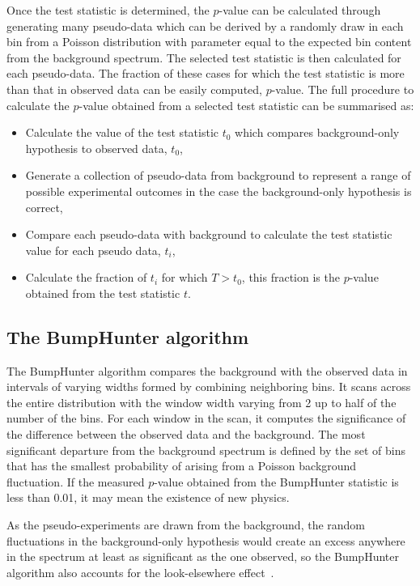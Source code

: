 Once the test statistic is determined, the $p$-value can be calculated through generating many pseudo-data which can be derived by a randomly draw in each bin from a Poisson distribution with parameter equal to the expected bin content from the background spectrum.
The selected test statistic is then calculated for each pseudo-data.
The fraction of these cases for which the test statistic is more than that in observed data can be easily computed, $p$-value.
The full procedure to calculate the $p$-value obtained from a selected test statistic can be summarised as:
\begin{itemize}
        \item Calculate the value of the test statistic $t_{0}$ which compares background-only hypothesis to observed data, $t_{0}$,
        \item Generate a collection of pseudo-data from background to represent a range of possible experimental outcomes in the case the background-only hypothesis is correct,
        \item Compare each pseudo-data with background to calculate the test statistic value for each pseudo data, $t_{i}$,
        \item Calculate the fraction of $t_{i}$ for which $T > t_{0}$, this fraction is the $p$-value obtained from the test statistic $t$.
\end{itemize}

\subsection{The BumpHunter algorithm}
The BumpHunter algorithm compares the background with the observed data in intervals of varying widths formed by combining neighboring bins. 
It scans across the entire distribution with the window width varying from 2 up to half of the number of the bins. 
For each window in the scan, it computes the significance of the difference between the observed data and the background. 
The most significant departure from the background spectrum is defined by the set of bins that has the smallest probability of arising from a Poisson background fluctuation. 
If the measured $p$-value obtained from the BumpHunter statistic is less than 0.01, it may mean the existence of new physics. 

As the pseudo-experiments are drawn from the background, the random fluctuations in the background-only hypothesis would create an excess anywhere in the spectrum at least as significant as the one observed, so the BumpHunter algorithm also accounts for the look-elsewhere effect~\cite{lyons2008, Gross2010}.

